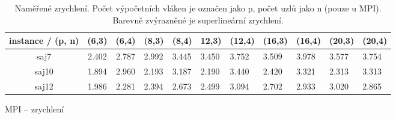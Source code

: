 \documentclass{article}
\begin{document}
\begin{table}[h]
        \begin{subtable}{.5\linewidth}\centering
        \begin{tabular}{|c|c|c|l|l|l|l|l|l|l|l|}
            \hline
            \textbf{instance / (p, n)} &
            \textbf{(6,3)} &
            \textbf{(6,4)} &
            \multicolumn{1}{c|}{\textbf{(8,3)}} &
            \multicolumn{1}{c|}{\textbf{(8,4)}} &
            \multicolumn{1}{c|}{\textbf{12,3)}} &
            \multicolumn{1}{c|}{\textbf{(12,4)}} &
            \multicolumn{1}{c|}{\textbf{(16,3)}} &
            \multicolumn{1}{c|}{\textbf{(16,4)}} &
            \multicolumn{1}{c|}{\textbf{(20,3)}} &
            \multicolumn{1}{c|}{\textbf{(20,4)}} \\ \hline
            saj7  & 2.402 & 2.787 & 2.992 & 3.445 & 3.450 & 3.752 & 3.509 & 3.978 & 3.577 & 3.754 \\ \hline
            saj10 & 1.894 & 2.960 & 2.193 & 3.187 & 2.190 & 3.440 & 2.420 & 3.321 & 2.313 & 3.313 \\ \hline
            saj12 & 1.986 & 2.281 & 2.394 & 2.673 & 2.499 & 3.094 & 2.702 & 2.933 & 3.020 & 2.865 \\ \hline
        \end{tabular}
        \caption{MPI -- zrychlení}\label{tab:speedup-mpi}
        \end{subtable}%

        \caption{Naměřené zrychlení. Počet výpočetních vláken je označen jako p, počet uzlů jako n (pouze u MPI). Barevně zvýrazněné je superlineární zrychlení.}
        \label{tab:speedup}
    \end{table}
\end{document}
